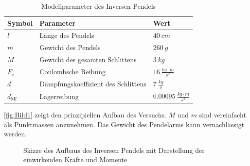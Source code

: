 \begin{table}[H]
    \centering
    \begin{tabular}{|lll|}
        \hline
        \rowcolor{grey}
        \textbf{Symbol}     & \textbf{Parameter}                    & \textbf{Wert}                          \\ \hline
        $l$                 & Länge des Pendels                     & $\SI{40}{cm}$                          \\
        $m$                 & Gewicht des Pendels                   & $\SI{260}{g}$                          \\
        $M$                 & Gewicht des gesamten Schlittens       & $\SI{3}{kg}$                           \\
        $F_{\mathrm{c}}$    & Coulombsche Reibung                   & $\SI{16}{\frac{kg \cdot m}{s^2}}$      \\
        $d$                 & Dämpfungskoeffizient des Schlittens   & $\SI{7}{\frac{kg}{s}}$                 \\
        $d_{\mathrm{Mf}}$   & Lagerreibung                          & $\SI{0.00095}{\frac{kg \cdot m}{s^2}}$ \\ \hline
    \end{tabular}
    \caption{Modellparameter des Inversen Pendels}
    \label{tab:my-table1}
\end{table}

\autoref{fig:Bild1} zeigt den prinzipiellen Aufbau des Versuchs. $M$ und $m$ sind vereinfacht als Punktmassen anzunehmen. Das Gewicht des Pendelarms kann vernachlässigt werden. 

\begin{figure}[H]
   \centering
   \caption[Skizze der Regelaufgabe]{Skizze des Aufbaus des Inversen Pendels mit Darstellung der einwirkenden Kräfte und Momente}
   \label{fig:Bild1}
\end{figure}